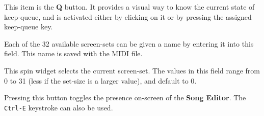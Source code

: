 

   This item is the \textbf{Q} button.
   It provides a visual way to know the current state of keep-queue, and is
   activated either by clicking on it or by pressing the assigned keep-queue
   key.

   Each of the 32 available screen-sets can be given a name by entering it
   into this field.  This name is saved with the MIDI file.

%

   This spin widget selects the current screen-set.  The values in this
   field range from 0 to 31 (less if the set-size is a larger value),
   and default to 0.

%

   Pressing this button toggles the presence on-screen of the
   \textbf{Song Editor}.  The \texttt{Ctrl-E} keystroke can also be used.


